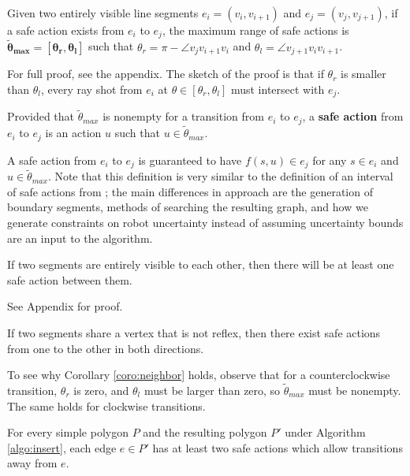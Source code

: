 \documentclass[]{styles/svproc}  %
\begin{document}
\begin{proposition} \label{prop:saferange}
Given two entirely visible line segments $e_i = (v_i, v_{i+1})$ and $e_j =
(v_j, v_{j+1})$, if a safe action
exists from $e_i$ to $e_j$, the maximum range of safe actions is $\bm{\tilde{\theta}_{max} = [\theta_r, \theta_l]}$ such
that $\theta_r = \pi - \angle v_j v_{i+1} v_i$ and $\theta_l = \angle v_{j+1}
v_i v_{i+1}$.
\end{proposition}

For full proof, see the appendix. The sketch of the proof is that if $\theta_r$
is smaller than $\theta_l$, every ray shot from $e_i$ at $\theta \in [\theta_r,
\theta_l]$ must intersect with $e_j$.


\begin{definition} \label{def:sa}
Provided that $\tilde{\theta}_{max}$ is nonempty for a transition from $e_i$ to
$e_j$, a \textbf{safe action} from $e_i$ to $e_j$ is an action $u$ such
that $u \in \tilde{\theta}_{max}$.
\end{definition}

A safe action from $e_i$ to $e_j$ is guaranteed to
have $f(s,u) \in e_j$ for any $s \in e_i$ and $u \in \tilde{\theta}_{max}$.
Note that this definition is very similar to the definition of an interval of
safe actions from \cite{LewOKa13}; the main differences in approach are the
generation of boundary segments, methods of searching the resulting graph, and
how we generate constraints on robot uncertainty instead of assuming uncertainty
bounds are an input to the algorithm.

\begin{lemma}
If two segments are entirely visible to each other, then there will be at least one safe
action between them.
\end{lemma}

See Appendix for proof.

\begin{corollary} \label{coro:neighbor}
If two segments share a vertex that is not reflex, then there exist safe actions
from one to the other in both directions.
\end{corollary}

To see why Corollary \ref{coro:neighbor} holds, observe that for a
counterclockwise transition,
$\theta_r$ is zero, and $\theta_l$ must be larger than zero, 
so $\tilde{\theta}_{max}$ must be nonempty. The same holds for clockwise
transitions.

\begin{proposition} \label{prop:twosafe}
For every simple polygon $P$ and the resulting polygon $P'$ under Algorithm
\ref{algo:insert}, each edge $e \in P'$ has at least two safe actions which allow
transitions away from $e$.
\end{proposition}
\end{document}
